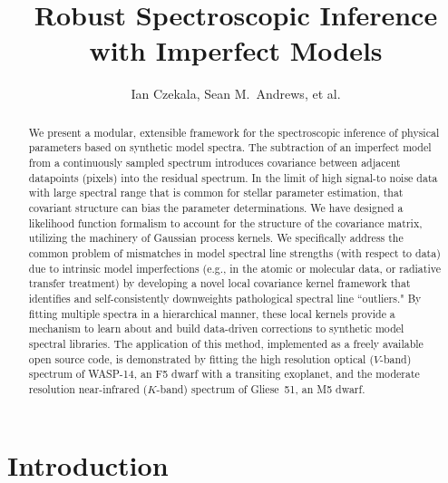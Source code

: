 \documentclass[iop,floatfix,twocolappendix]{emulateapj}
\begin{document}
\graphicspath{{figs/}}



\title{Robust Spectroscopic Inference with Imperfect Models}

\author{Ian Czekala, Sean M.~Andrews, et al.}

\begin{abstract}
We present a modular, extensible framework for the spectroscopic inference of 
physical parameters based on synthetic model spectra.  The subtraction of an 
imperfect model from a continuously sampled spectrum introduces covariance 
between adjacent datapoints (pixels) into the residual spectrum.  In the limit 
of high signal-to noise data with large spectral range that is common for 
stellar parameter estimation, that covariant structure can bias the parameter 
determinations.  We have designed a likelihood function formalism to account 
for the structure of the covariance matrix, utilizing the machinery of Gaussian 
process kernels.  We specifically address the common problem of mismatches in 
model spectral line strengths (with respect to data) due to intrinsic model 
imperfections (e.g., in the atomic or molecular data, or radiative transfer 
treatment) by developing a novel local covariance kernel framework that 
identifies and self-consistently downweights pathological spectral line 
``outliers."  By fitting multiple spectra in a hierarchical manner, these local 
kernels provide a mechanism to learn about and build data-driven corrections to 
synthetic model spectral libraries.  The application of this method, 
implemented as a freely available open source code, is demonstrated by fitting 
the high resolution optical ($V$-band) spectrum of WASP-14, an F5 dwarf with a 
transiting exoplanet, and the moderate resolution near-infrared ($K$-band) 
spectrum of Gliese~51, an M5 dwarf. 
\end{abstract}




\section{Introduction} \label{sec:intro}
\end{document}
